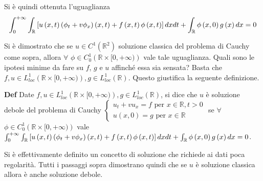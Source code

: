 \documentclass{article}
\begin{document}
Si \`{e} quindi ottenuta l'uguaglianza 
\begin{equation*}
\int_{0}^{+\infty }\int_{%
\mathbb{R}
}\left[ u\left( x,t\right) \left( \phi _{t}+v\phi _{x}\right) \left(
x,t\right) +f\left( x,t\right) \phi \left( x,t\right) \right] dxdt+\int_{%
\mathbb{R}
}\phi \left( x,0\right) g\left( x\right) dx=0
\end{equation*}

Si \`{e} dimostrato che se $u\in C^{1}\left( 
\mathbb{R}
^{2}\right) $ soluzione classica del problema di Cauchy come sopra, allora $%
\forall $ $\phi \in C_{0}^{1}\left( 
\mathbb{R}
\times \lbrack 0,+\infty )\right) $ vale tale uguaglianza. Quali sono le
ipotesi minime da fare su $f$, $g$ e $u$ affinch\'{e} essa sia sensata?
Basta che $f,u\in L_{loc}^{1}\left( 
\mathbb{R}
\times \lbrack 0,+\infty )\right) ,g\in L_{loc}^{1}\left( 
\mathbb{R}
\right) $. Questo giustifica la seguente definizione.

\textbf{Def} Date $f,u\in L_{loc}^{1}\left( 
\mathbb{R}
\times \lbrack 0,+\infty )\right) ,g\in L_{loc}^{1}\left( 
\mathbb{R}
\right) $, si dice che $u$ \`{e} soluzione debole del problema di Cauchy $%
\left\{ 
\begin{array}{c}
u_{t}+vu_{x}=f\text{ per }x\in 
\mathbb{R}
,t>0 \\ 
u\left( x,0\right) =g\text{ per }x\in 
\mathbb{R}%
\end{array}%
\right. $ se $\forall $ $\phi \in C_{0}^{1}\left( 
\mathbb{R}
\times \lbrack 0,+\infty )\right) $ vale $\int_{0}^{+\infty }\int_{%
\mathbb{R}
}\left[ u\left( x,t\right) \left( \phi _{t}+v\phi _{x}\right) \left(
x,t\right) +f\left( x,t\right) \phi \left( x,t\right) \right] dxdt+\int_{%
\mathbb{R}
}\phi \left( x,0\right) g\left( x\right) dx=0$.

Si \`{e} effettivamente definito un concetto di soluzione che richiede ai
dati poca regolarit\`{a}. Tutti i passaggi sopra dimostrano quindi che se $u$
\`{e} soluzione classica allora \`{e} anche soluzione debole.
\end{document}
